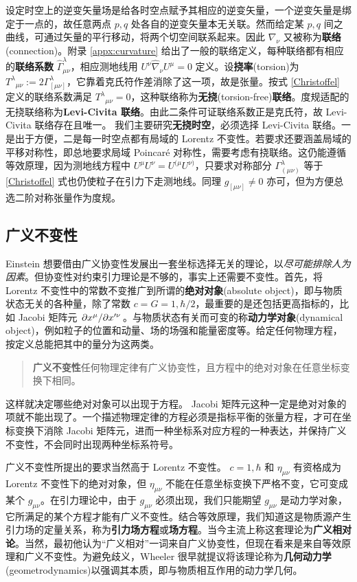 设定时空上的逆变矢量场是给各时空点赋予其相应的逆变矢量，一个逆变矢量是绑定于一点的，故任意两点 $p,q$ 处各自的逆变矢量本无关联。然而给定某 $p,q$ 间之曲线，可通过矢量的平行移动，将两个切空间联系起来。因此 $\nabla_\nu$ 又被称为\textbf{联络}(connection)。附录 \ref{appx:curvature} 给出了一般的联络定义，每种联络都有相应的\textbf{联络系数} $\hat{\Gamma}^\lambda_{\mu\nu}$，相应测地线用 $U^\nu\hat\nabla_\nu U^\mu=0$ 定义。设\textbf{挠率}(torsion)为 $T^\lambda{}_{\mu\nu}:=2\Gamma^\lambda_{[\mu\nu]}$，它靠着克氏符作差消除了这一项，故是张量。按式 \eqref{Christoffel} 定义的联络系数满足 $T^\lambda{}_{\mu\nu}=0$，这种联络称为\textbf{无挠}(torsion-free)\textbf{联络}。度规适配的无挠联络称为\textbf{Levi-Civita 联络}。由此二条件可证联络系数正是克氏符，故 Levi-Civita 联络存在且唯一。
我们主要研究\textbf{无挠时空}，必须选择 Levi-Civita 联络。一是出于方便，二是每一时空点都有局域的 Lorentz 不变性。若要求还要涵盖局域的平移对称性，即总地要求局域 Poincaré 对称性，需要考虑有挠联络。这仍能遵循等效原理，因为测地线方程中 $U^\mu U^\nu=U^{(\mu} U^{\nu)}$，只要求对称部分 $\Gamma^\lambda_{(\mu\nu)}$ 等于 \eqref{Christoffel} 式也仍使粒子在引力下走测地线。同理 $g_{[\mu\nu]}\ne 0$ 亦可，但为方便总选二阶对称张量作为度规。 

\subsection{广义不变性}

Einstein 想要借由广义协变性发展出一套坐标选择无关的理论，以\textit{尽可能排除人为因素}。但协变性对约束引力理论是不够的，事实上还需要不变性。首先，将 Lorentz 不变性中的常数不变推广到所谓的\textbf{绝对对象}(absolute object)，即与物质状态无关的各种量，除了常数 $c=G=1,\hbar/2$，最重要的是还包括更高指标的，比如 Jacobi 矩阵元 $\pdv*{x^\mu}{x'^\nu}$。与物质状态有关而可变的称\textbf{动力学对象}(dynamical object)，例如粒子的位置和动量、场的场强和能量密度等。给定任何物理方程，按定义总能把其中的量分为这两类。
\begin{quote}
    \textbf{广义不变性}\quad 任何物理定律有广义协变性，且方程中的绝对对象在任意坐标变换下相同。
\end{quote}
这样就决定哪些绝对对象可以出现于方程。
Jacobi 矩阵元这种一定是绝对对象的项就不能出现了。一个描述物理定律的方程必须是指标平衡的张量方程，才可在坐标变换下消除 Jacobi 矩阵元，进而一种坐标系对应方程的一种表达，并保持广义不变性，不会同时出现两种坐标系符号。

广义不变性所提出的要求当然高于 Lorentz 不变性。
$c=1,\hbar$ 和 $\eta_{\mu\nu}$ 有资格成为 Lorentz 不变性下的绝对对象，但 $\eta_{\mu\nu}$ 不能在任意坐标变换下严格不变，它可变成某个 $g_{\mu\nu}$。在引力理论中，由于 $g_{\mu\nu}$ 必须出现，我们只能期望 $g_{\mu\nu}$ 是动力学对象，它所满足的某个方程才能有广义不变性。结合等效原理，我们知道这是物质源产生引力场的定量关系，称为\textbf{引力场方程}或\textbf{场方程}。当今主流上称这套理论为\textbf{广义相对论}。当然，最初他认为“广义相对”一词来自广义协变性，但现在看来是来自等效原理和广义不变性。为避免歧义，Wheeler 很早就提议将该理论称为\textbf{几何动力学}(geometrodynamics)以强调其本质，即与物质相互作用的动力学几何。 


